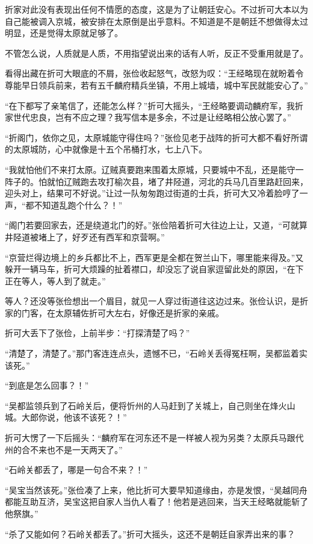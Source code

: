 折家对此没有表现出任何不情愿的态度，这是为了让朝廷安心。不过折可大本以为自己能被调入京城，被安排在太原倒是出乎意料。不知道是不是朝廷不想做得太过明显，还是觉得太原就足够了。

不管怎么说，人质就是人质，不用指望说出来的话有人听，反正不受重用就是了。

看得出藏在折可大眼底的不屑，张俭收起怒气，改怒为叹：“王经略现在就盼着令尊能早日领兵前来，若有五千麟府精兵坐镇，不用上城墙，城中军民就能安心了。”

“在下都写了亲笔信了，还能怎么样？”折可大摇头，“王经略要调动麟府军，我折家世代忠良，岂有不应之理？我写信本是多余，不过是让经略相公放心罢了。”

“折阁门，依你之见，太原城能守得住吗？”张俭见老于战阵的折可大都不看好所谓的太原城防，心中就像是十五个吊桶打水，七上八下。

“我就怕他们不来打太原。辽贼真要跑来围着太原城，只要城中不乱，还是能守一阵子的。怕就怕辽贼跑去攻打榆次县，堵了井陉道，河北的兵马几百里路赶回来，迎头对上，结果可不好说。”让过一队匆匆跑过街道的士兵，折可大又冷着脸哼了一声，“都不知道乱跑个什么？！”

“阁门若要回家去，还是绕道北门的好。”张俭陪着折可大往边上让，又道，“可就算井陉道被堵上了，好歹还有西军和京营啊。”

“京营烂得边境上的乡兵都比不上，西军更是全都在贺兰山下，哪里能来得及。”又躲开一辆马车，折可大烦躁的扯着襟口，却没忘了说自家逗留此处的原因，“在下正在等人，等人到了就走。”

等人？还没等张俭想出一个眉目，就见一人穿过街道往这边过来。张俭认识，是折家的门客，在太原辅佐折可大左右，好像还是折家的亲戚。

折可大丢下了张俭，上前半步：“打探清楚了吗？”

“清楚了，清楚了。”那门客连连点头，遗憾不已，“石岭关丢得冤枉啊，吴都监着实该死。”

“到底是怎么回事？！”

“吴都监领兵到了石岭关后，便将忻州的人马赶到了关城上，自己则坐在烽火山城。大郎你说，他该不该死？！”

折可大愣了一下后摇头：“麟府军在河东还不是一样被人视为另类？太原兵马跟代州的合不来也不是一天两天了。”

“石岭关都丢了，哪是一句合不来？！”

“吴宝当然该死。”张俭凑了上来，他比折可大要早知道缘由，亦是发恨，“吴越同舟都能互助互济，吴宝这把自家人当仇人看了！他若是逃回来，当天王经略就能斩了他祭旗。”

“杀了又能如何？石岭关都丢了。”折可大摇头，这还不是朝廷自家弄出来的事？


